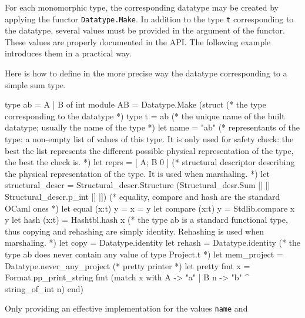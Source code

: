 For each monomorphic type, the corresponding datatype may be created by applying
the functor \texttt{Datatype.Make}. In addition to the
type \texttt{t} corresponding to the datatype, several values must be provided
in the argument of the functor. These values are properly documented in the
\framac API. The following example introduces them in a practical way.
\begin{example}
Here is how to define in the more precise way the datatype corresponding to a
simple sum type.
\begin{ocamlcode}
type ab = A | B of int
module AB =
  Datatype.Make
    (struct
       (* the type corresponding to the datatype *)
       type t = ab
       (* the unique name of the built datatype; usually the name of the
          type *)
       let name = "ab"
       (* representants of the type: a non-empty list of values of this type. It
          is only used for safety check: the best the list represents the
          different possible physical representation of the type, the best the
          check is. *)
       let reprs = [ A; B 0 ]
       (* structural descriptor describing the physical representation of the
          type. It is used when marshaling. *)
       let structural_descr =
         Structural_descr.Structure
           (Structural_desr.Sum [| [| Structural_descr.p_int |] |])
       (* equality, compare and hash are the standard OCaml ones *)
       let equal (x:t) y = x = y
       let compare (x:t) y = Stdlib.compare x y
       let hash (x:t) = Hashtbl.hash x
       (* the type ab is a standard functional type, thus copying and rehashing
          are simply identity. Rehashing is used when marshaling. *)
       let copy = Datatype.identity
       let rehash = Datatype.identity
       (* the type ab does never contain any value of type Project.t *)
       let mem_project = Datatype.never_any_project
       (* pretty printer *)
       let pretty fmt x =
         Format.pp_print_string fmt
          (match x with A -> "a" | B n -> "b" ^ string_of_int n)
     end)
\end{ocamlcode}
\end{example}
Only providing an effective implementation for the values \texttt{name} and
